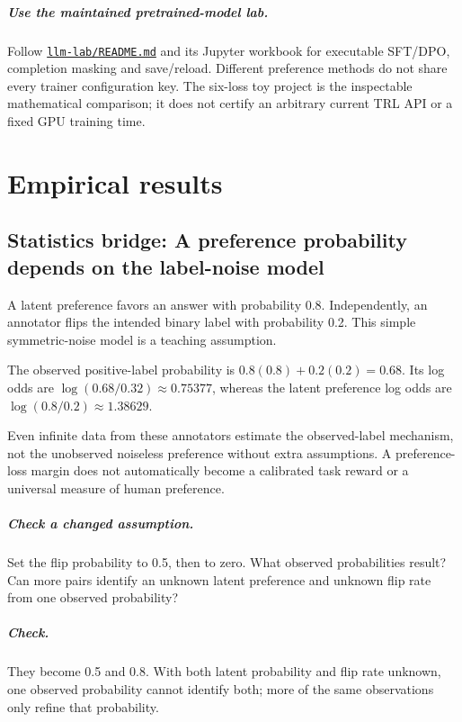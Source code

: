 \documentclass[11pt,oneside]{scrbook}
\begin{document}
\paragraph{Use the maintained pretrained-model lab.}
Follow \href{../llm-lab/README.md}{\texttt{llm-lab/README.md}} and its
Jupyter workbook for executable SFT/DPO, completion masking and save/reload.
Different preference methods do not share every trainer configuration key.
The six-loss toy project is the inspectable mathematical comparison; it does
not certify an arbitrary current TRL API or a fixed GPU training time.

\chapter{Empirical results}

\section{Statistics bridge: A preference probability depends on the label-noise model}
\begin{example}
A latent preference favors an answer with probability 0.8. Independently, an annotator flips the intended binary label with probability 0.2. This simple symmetric-noise model is a teaching assumption.

The observed positive-label probability is $0.8(0.8)+0.2(0.2)=0.68$. Its log odds are $\log(0.68/0.32)\approx0.75377$, whereas the latent preference log odds are $\log(0.8/0.2)\approx1.38629$.
\end{example}
Even infinite data from these annotators estimate the observed-label mechanism, not the unobserved noiseless preference without extra assumptions. A preference-loss margin does not automatically become a calibrated task reward or a universal measure of human preference.

\paragraph{Check a changed assumption.} Set the flip probability to 0.5, then to zero. What observed probabilities result? Can more pairs identify an unknown latent preference and unknown flip rate from one observed probability?
\paragraph{Check.} They become 0.5 and 0.8. With both latent probability and flip rate unknown, one observed probability cannot identify both; more of the same observations only refine that probability.
\end{document}
